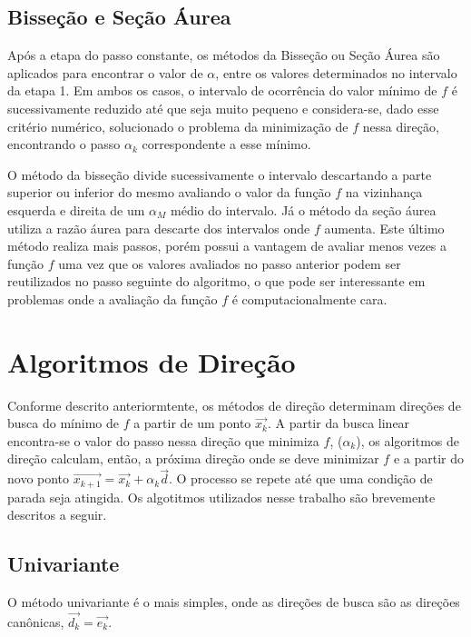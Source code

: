 \documentclass[10pt, a4paper]{article}
\begin{document}
\subsection{Bisse\c c\~ao e Se\c c\~ao \'Aurea}

Ap\'os a etapa do passo constante, os m\'etodos da Bisse\c c\~ao ou Se\c c\~ao \'Aurea s\~ao aplicados para encontrar o valor de $\alpha$, entre os valores determinados no intervalo da etapa 1. Em ambos os casos, o intervalo de ocorr\^encia do valor m\'inimo de $f$ \'e sucessivamente reduzido at\'e que seja muito pequeno e considera-se, dado esse crit\'erio num\'erico, solucionado o problema da minimiza\c c\~ao de $f$ nessa dire\c c\~ao, encontrando o passo $\alpha_{k}$ correspondente a esse m\'inimo.

O m\'etodo da bisse\c c\~ao divide sucessivamente o intervalo descartando a parte superior ou inferior do mesmo avaliando o valor da fun\c c\~ao $f$ na vizinhan\c ca esquerda e direita de um $\alpha_{M}$ m\'edio do intervalo. J\'a o m\'etodo da se\c c\~ao \'aurea utiliza a raz\~ao \'aurea para descarte dos intervalos onde $f$ aumenta. Este \'ultimo m\'etodo realiza mais passos, por\'em possui a vantagem de avaliar menos vezes a fun\c c\~ao $f$ uma vez que os valores avaliados no passo anterior podem ser reutilizados no passo seguinte do algoritmo, o que pode ser interessante em problemas onde a avalia\c c\~ao da fun\c c\~ao $f$ \'e computacionalmente cara.

\section{Algoritmos de Dire\c c\~ao}

Conforme descrito anteriormtente, os m\'etodos de dire\c c\~ao determinam dire\c c\~oes de busca do m\'inimo de $f$ a partir de um ponto $\vec{x_{k}}$. A partir da busca linear encontra-se o valor do passo nessa dire\c c\~ao que minimiza $f$, ($\alpha_{k}$), os algoritmos de dire\c c\~ao calculam, ent\~ao, a pr\'oxima dire\c c\~ao onde se deve minimizar $f$ e a partir do novo ponto $\vec{x_{k+1}}=\vec{x_k}+\alpha_{k}\vec{d}$. O processo se repete at\'e que uma condi\c c\~ao de parada seja atingida. Os algotitmos utilizados nesse trabalho s\~ao brevemente descritos a seguir.

\subsection{Univariante}

O m\'etodo univariante \'e o mais simples, onde as dire\c c\~oes de busca s\~ao as dire\c c\~oes can\^onicas, $\vec{d_{k}}=\vec{e_{k}}$.
\end{document}
